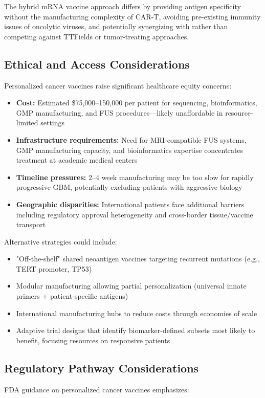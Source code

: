 \documentclass[12pt]{article}
\begin{document}
The hybrid mRNA vaccine approach differs by providing antigen specificity without the manufacturing complexity of CAR-T, avoiding pre-existing immunity issues of oncolytic viruses, and potentially synergizing with rather than competing against TTFields or tumor-treating approaches.

\subsection{Ethical and Access Considerations}
Personalized cancer vaccines raise significant healthcare equity concerns:

\begin{itemize}[leftmargin=*,noitemsep]
\item \textbf{Cost:} Estimated \$75,000--150,000 per patient for sequencing, bioinformatics, GMP manufacturing, and FUS procedures—likely unaffordable in resource-limited settings
\item \textbf{Infrastructure requirements:} Need for MRI-compatible FUS systems, GMP manufacturing capacity, and bioinformatics expertise concentrates treatment at academic medical centers
\item \textbf{Timeline pressures:} 2--4 week manufacturing may be too slow for rapidly progressive GBM, potentially excluding patients with aggressive biology
\item \textbf{Geographic disparities:} International patients face additional barriers including regulatory approval heterogeneity and cross-border tissue/vaccine transport
\end{itemize}

Alternative strategies could include:
\begin{itemize}[leftmargin=*,noitemsep]
\item "Off-the-shelf" shared neoantigen vaccines targeting recurrent mutations (e.g., TERT promoter, TP53)
\item Modular manufacturing allowing partial personalization (universal innate primers + patient-specific antigens)
\item International manufacturing hubs to reduce costs through economies of scale
\item Adaptive trial designs that identify biomarker-defined subsets most likely to benefit, focusing resources on responsive patients
\end{itemize}

\subsection{Regulatory Pathway Considerations}
FDA guidance on personalized cancer vaccines emphasizes:
\end{document}
